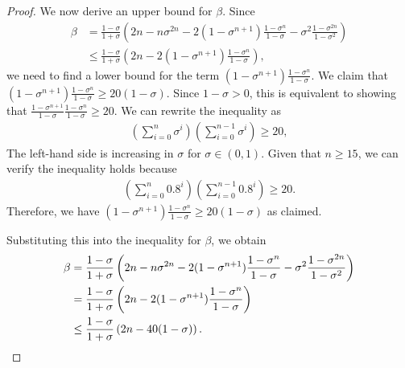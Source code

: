 \documentclass{article}
\theoremstyle{plain}
\theoremstyle{definition}
\theoremstyle{remark}
\def\bigopen#1{\left(#1\right)}
\begin{document}
\begin{proof}
We now derive an upper bound for $\beta$. Since 
\begin{align*}
    \beta &= \frac{1-\sigma}{1+\sigma} \bigopen{2n-n\sigma^{2n}-2(1-\sigma^{n+1})\frac{1-\sigma^n}{1-\sigma}-\sigma^2\frac{1-\sigma^{2n}}{1-\sigma^2} } \\
    &\le \frac{1-\sigma}{1+\sigma} \bigopen{2n-2(1-\sigma^{n+1})\frac{1-\sigma^n}{1-\sigma}},
\end{align*}
we need to find a lower bound for the term $(1-\sigma^{n+1})\frac{1-\sigma^n}{1-\sigma}$.
We claim that $(1-\sigma^{n+1})\frac{1-\sigma^n}{1-\sigma} \ge 20(1-\sigma)$. Since $1-\sigma > 0$, this is equivalent to showing that $\frac{1-\sigma^{n+1}}{1-\sigma} \frac{1-\sigma^n}{1-\sigma} \ge 20$. 
We can rewrite the inequality as
\begin{align*}
    \bigopen{\sum_{i=0}^n \sigma^i} \bigopen{\sum_{i=0}^{n-1} \sigma^i} \ge 20,
\end{align*}
The left-hand side is increasing in $\sigma$ for $\sigma \in (0,1)$. Given that $n \ge 15$, we can verify the inequality holds because 
\begin{align*}
    \bigopen{\sum_{i=0}^n 0.8^i} \bigopen{\sum_{i=0}^{n-1} 0.8^i} \ge 20.
\end{align*}
Therefore, we have $(1-\sigma^{n+1})\frac{1-\sigma^n}{1-\sigma} \ge 20(1-\sigma)$ as claimed.

Substituting this into the inequality for $\beta$, we obtain
\begin{align}
    \beta &= \frac{1-\sigma}{1+\sigma} \bigopen{2n-n\sigma^{2n}-2(1-\sigma^{n+1})\frac{1-\sigma^n}{1-\sigma}-\sigma^2\frac{1-\sigma^{2n}}{1-\sigma^2} } \notag \\
    &= \frac{1-\sigma}{1+\sigma} \bigopen{2n-2(1-\sigma^{n+1})\frac{1-\sigma^n}{1-\sigma}} \notag \\
    &\le \frac{1-\sigma}{1+\sigma} \bigopen{2n - 40(1-\sigma)}. \label{eq:betaub}
\end{align}


\end{proof}
\end{document}
